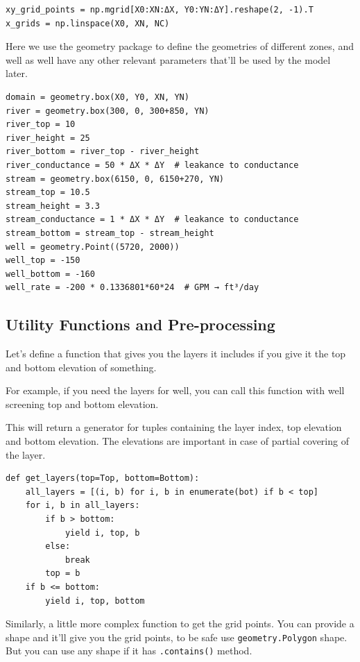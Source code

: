 \documentclass[titlepage,12pt]{unisubmission}
\begin{document}
\begin{verbatim}
xy_grid_points = np.mgrid[X0:XN:ΔX, Y0:YN:ΔY].reshape(2, -1).T
x_grids = np.linspace(X0, XN, NC)
\end{verbatim}


Here we use the geometry package to define the geometries of different zones, and well as well have any other relevant parameters that'll be used by the model later.

\begin{verbatim}
domain = geometry.box(X0, Y0, XN, YN)
river = geometry.box(300, 0, 300+850, YN)
river_top = 10
river_height = 25
river_bottom = river_top - river_height
river_conductance = 50 * ΔX * ΔY  # leakance to conductance
stream = geometry.box(6150, 0, 6150+270, YN)
stream_top = 10.5
stream_height = 3.3
stream_conductance = 1 * ΔX * ΔY  # leakance to conductance
stream_bottom = stream_top - stream_height
well = geometry.Point((5720, 2000))
well_top = -150
well_bottom = -160
well_rate = -200 * 0.1336801*60*24  # GPM → ft³/day
\end{verbatim}

\subsection{Utility Functions and Pre-processing}
\label{sec:org069cb3e}
Let's define a function that gives you the layers it includes if you give it the top and bottom elevation of something.

For example, if you need the layers for well, you can call this function with well screening top and bottom elevation.

This will return a generator for tuples containing the layer index, top elevation and bottom elevation. The elevations are important in case of partial covering of the layer.

\begin{verbatim}
def get_layers(top=Top, bottom=Bottom):
    all_layers = [(i, b) for i, b in enumerate(bot) if b < top]
    for i, b in all_layers:
        if b > bottom:
            yield i, top, b
        else:
            break
        top = b
    if b <= bottom:
        yield i, top, bottom
\end{verbatim}


Similarly, a little more complex function to get the grid points. You can provide a shape and it'll give you the grid points, to be safe use \texttt{geometry.Polygon} shape. But you can use any shape if it has \texttt{.contains()} method.
\end{document}
